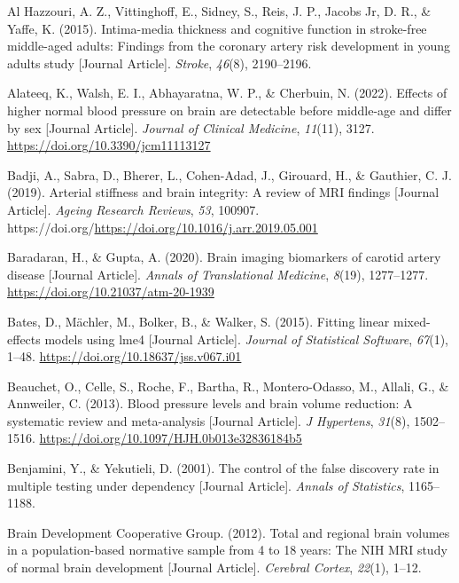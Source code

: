 \documentclass[
  letterpaper,
  DIV=11,
  numbers=noendperiod]{scrreport}
\newlength{\cslhangindent}
\newenvironment{CSLReferences}[2] %
 {\begin{list}{}{%
  \setlength{\itemindent}{0pt}
  \setlength{\leftmargin}{0pt}
  \setlength{\parsep}{0pt}
  \ifodd #1
   \setlength{\leftmargin}{\cslhangindent}
   \setlength{\itemindent}{-1\cslhangindent}
  \fi
  \setlength{\itemsep}{#2\baselineskip}}}
 {\end{list}}
\begin{document}
\label{refs--7}
\begin{CSLReferences}{1}{0}
Al Hazzouri, A. Z., Vittinghoff, E., Sidney, S., Reis, J. P., Jacobs Jr,
D. R., \& Yaffe, K. (2015). Intima-media thickness and cognitive
function in stroke-free middle-aged adults: Findings from the coronary
artery risk development in young adults study {[}Journal Article{]}.
\emph{Stroke}, \emph{46}(8), 2190--2196.

Alateeq, K., Walsh, E. I., Abhayaratna, W. P., \& Cherbuin, N. (2022).
Effects of higher normal blood pressure on brain are detectable before
middle-age and differ by sex {[}Journal Article{]}. \emph{Journal of
Clinical Medicine}, \emph{11}(11), 3127.
\url{https://doi.org/10.3390/jcm11113127}

Badji, A., Sabra, D., Bherer, L., Cohen-Adad, J., Girouard, H., \&
Gauthier, C. J. (2019). Arterial stiffness and brain integrity: A review
of MRI findings {[}Journal Article{]}. \emph{Ageing Research Reviews},
\emph{53}, 100907.
https://doi.org/\url{https://doi.org/10.1016/j.arr.2019.05.001}

Baradaran, H., \& Gupta, A. (2020). Brain imaging biomarkers of carotid
artery disease {[}Journal Article{]}. \emph{Annals of Translational
Medicine}, \emph{8}(19), 1277--1277.
\url{https://doi.org/10.21037/atm-20-1939}

Bates, D., Mächler, M., Bolker, B., \& Walker, S. (2015). Fitting linear
mixed-effects models using lme4 {[}Journal Article{]}. \emph{Journal of
Statistical Software}, \emph{67}(1), 1--48.
\url{https://doi.org/10.18637/jss.v067.i01}

Beauchet, O., Celle, S., Roche, F., Bartha, R., Montero-Odasso, M.,
Allali, G., \& Annweiler, C. (2013). Blood pressure levels and brain
volume reduction: A systematic review and meta-analysis {[}Journal
Article{]}. \emph{J Hypertens}, \emph{31}(8), 1502--1516.
\url{https://doi.org/10.1097/HJH.0b013e32836184b5}

Benjamini, Y., \& Yekutieli, D. (2001). The control of the false
discovery rate in multiple testing under dependency {[}Journal
Article{]}. \emph{Annals of Statistics}, 1165--1188.

Brain Development Cooperative Group. (2012). Total and regional brain
volumes in a population-based normative sample from 4 to 18 years: The
NIH MRI study of normal brain development {[}Journal Article{]}.
\emph{Cerebral Cortex}, \emph{22}(1), 1--12.


\end{CSLReferences}
\end{document}
